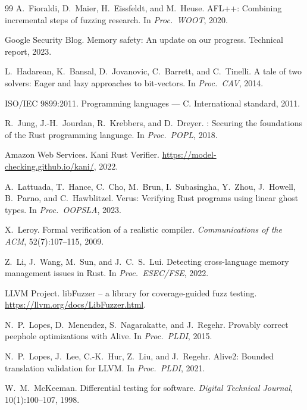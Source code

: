 \documentclass[11pt]{article}
\begin{document}
\begin{thebibliography}{99}
A.~Fioraldi, D.~Maier, H.~Eissfeldt, and M.~Heuse.
\newblock AFL++: Combining incremental steps of fuzzing research.
\newblock In \emph{Proc.\ WOOT}, 2020.

{Google Security Blog}.
\newblock Memory safety: An update on our progress.
\newblock Technical report, 2023.

L.~Hadarean, K.~Bansal, D.~Jovanovic, C.~Barrett, and C.~Tinelli.
\newblock A tale of two solvers: Eager and lazy approaches to bit-vectors.
\newblock In \emph{Proc.\ CAV}, 2014.

{ISO/IEC 9899:2011}.
\newblock Programming languages --- C.
\newblock International standard, 2011.

R.~Jung, J.-H.~Jourdan, R.~Krebbers, and D.~Dreyer.
: Securing the foundations of the {Rust} programming language.
\newblock In \emph{Proc.\ POPL}, 2018.

{Amazon Web Services}.
\newblock Kani Rust Verifier.
\newblock \url{https://model-checking.github.io/kani/}, 2022.

A.~Lattuada, T.~Hance, C.~Cho, M.~Brun, I.~Subasingha, Y.~Zhou, J.~Howell, B.~Parno, and C.~Hawblitzel.
\newblock Verus: Verifying {Rust} programs using linear ghost types.
\newblock In \emph{Proc.\ OOPSLA}, 2023.

X.~Leroy.
\newblock Formal verification of a realistic compiler.
\newblock \emph{Communications of the ACM}, 52(7):107--115, 2009.

Z.~Li, J.~Wang, M.~Sun, and J.~C.~S.~Lui.
\newblock Detecting cross-language memory management issues in Rust.
\newblock In \emph{Proc.\ ESEC/FSE}, 2022.

{LLVM Project}.
\newblock libFuzzer -- a library for coverage-guided fuzz testing.
\newblock \url{https://llvm.org/docs/LibFuzzer.html}.

N.~P.~Lopes, D.~Menendez, S.~Nagarakatte, and J.~Regehr.
\newblock Provably correct peephole optimizations with {Alive}.
\newblock In \emph{Proc.\ PLDI}, 2015.

N.~P.~Lopes, J.~Lee, C.-K.~Hur, Z.~Liu, and J.~Regehr.
\newblock Alive2: Bounded translation validation for {LLVM}.
\newblock In \emph{Proc.\ PLDI}, 2021.

W.~M.~McKeeman.
\newblock Differential testing for software.
\newblock \emph{Digital Technical Journal}, 10(1):100--107, 1998.


\end{thebibliography}
\end{document}
